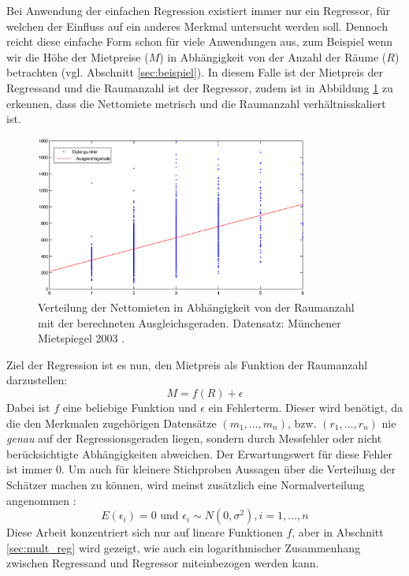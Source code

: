 Bei Anwendung der einfachen Regression existiert immer nur ein Regressor, für welchen der Einfluss auf ein anderes Merkmal untersucht werden soll.
Dennoch reicht diese einfache Form schon für viele Anwendungen aus, zum Beispiel wenn wir die Höhe der Mietpreise ($M$) in Abhängigkeit von der Anzahl der Räume ($R$) betrachten (vgl. Abschnitt \ref{sec:beispiel}).
In diesem Falle ist der Mietpreis der Regressand und die Raumanzahl ist der Regressor, zudem ist in Abbildung \ref{fig:nm_rooms_distribution} zu erkennen, dass die Nettomiete metrisch und die Raumanzahl verhältnisskaliert ist.
\begin{figure}[t]
  \centering
  \includegraphics[width=0.8\textwidth]{figures/nm_rooms_distribution}
  \caption{Verteilung der Nettomieten in Abhängigkeit von der Raumanzahl mit der berechneten Ausgleichsgeraden. Datensatz: Münchener Mietspiegel 2003 \cite{Fahrmeir2011}.}
  \label{fig:nm_rooms_distribution}
\end{figure}
Ziel der Regression ist es nun, den Mietpreis als Funktion der Raumanzahl darzustellen:
\begin{equation*}
 M = f(R) + \epsilon
\end{equation*}
Dabei ist $f$ eine beliebige Funktion und $\epsilon$ ein Fehlerterm.
Dieser wird benötigt, da die den Merkmalen zugehörigen Datensätze $(m_1, \dots, m_n)$, bzw. $(r_1, \dots, r_n)$ nie \textit{genau} auf der Regressionsgeraden liegen, sondern durch Messfehler oder nicht berücksichtigte Abhängigkeiten abweichen.
Der Erwartungswert für diese Fehler ist immer $0$. 
Um auch für kleinere Stichproben Aussagen über die Verteilung der Schätzer machen zu können, wird meinst zusätzlich eine Normalverteilung angenommen \cite[S. 479]{Fahrmeir2010}:
\begin{equation*}
  E(\epsilon_i) = 0 \text{ und } \epsilon_i \sim N(0,\sigma^2), i = 1, \dots, n
\end{equation*}
Diese Arbeit konzentriert sich nur auf lineare Funktionen $f$, aber in Abschnitt \ref{sec:mult_reg} wird gezeigt, wie auch ein logarithmischer Zusammenhang zwischen Regressand und Regressor miteinbezogen werden kann.
